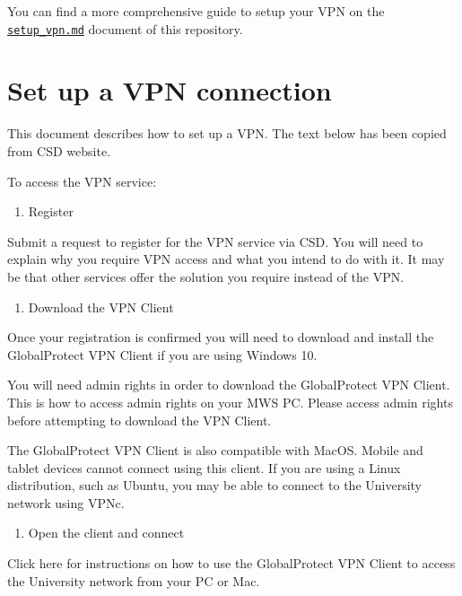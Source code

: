 \documentclass[
]{book}
\providecommand{\tightlist}{%
  \setlength{\itemsep}{0pt}\setlength{\parskip}{0pt}}
\begin{document}
You can find a more comprehensive guide to setup your VPN on the
\href{setup_vpn.md}{\texttt{setup\_vpn.md}} document of this repository.

\hypertarget{set-up-a-vpn-connection}{%
\section{Set up a VPN connection}\label{set-up-a-vpn-connection}}

This document describes how to set up a VPN. The text below has been copied from CSD website.

To access the VPN service:

\begin{enumerate}
\def\labelenumi{\arabic{enumi}.}
\tightlist
\item
  Register
\end{enumerate}

Submit a request to register for the VPN service via CSD. You will need to explain why you require VPN access and what you intend to do with it. It may be that other services offer the solution you require instead of the VPN.

\begin{enumerate}
\def\labelenumi{\arabic{enumi}.}
\setcounter{enumi}{1}
\tightlist
\item
  Download the VPN Client
\end{enumerate}

Once your registration is confirmed you will need to download and install the GlobalProtect VPN Client if you are using Windows 10.

You will need admin rights in order to download the GlobalProtect VPN Client. This is how to access admin rights on your MWS PC. Please access admin rights before attempting to download the VPN Client.

The GlobalProtect VPN Client is also compatible with MacOS. Mobile and tablet devices cannot connect using this client. If you are using a Linux distribution, such as Ubuntu, you may be able to connect to the University network using VPNc.

\begin{enumerate}
\def\labelenumi{\arabic{enumi}.}
\setcounter{enumi}{2}
\tightlist
\item
  Open the client and connect
\end{enumerate}

Click here for instructions on how to use the GlobalProtect VPN Client to access the University network from your PC or Mac.
\end{document}
